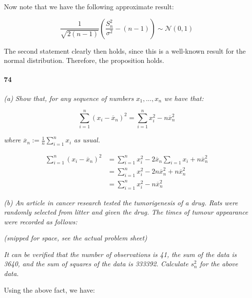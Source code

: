 \documentclass[a4paper]{article}
\begin{document}
                Now note that we have the following approximate result:

                \[
                    \frac{1}{\sqrt{2 (n-1)}}\left(\frac{S_n^2}{\sigma^2} - (n -
                    1)\right) \sim \mathcal{N}(0, 1)
                \]

                The second statement clearly then holds, since this is a
                well-known result for the normal distribution. Therefore, the
                proposition holds.

            \paragraph{74}
            \textit{(a) Show that, for any sequence of numbers $x_1, ..., x_n$
            we have that:}

            \[
                \sum_{i=1}^n (x_i - \overline x_n)^2 = \sum_{i=1}^n x_i^2 -
                n\overline x_n^2
            \]

            \textit{where $\overline x_n := \frac{1}{n} \sum\limits_{i=1}^n x_i$
            as usual.}

                \begin{align*}
                    \sum_{i=1}^n (x_i - \overline x_n)^2 & = \sum_{i=1}^n x_i^2
                        - 2\overline x_n \sum_{i=1} x_i + n \overline x_n^2 \\
                    & = \sum_{i=1}^n x_i^2 - 2 n\overline x_n^2 + n \overline
                        x_n^2 \\
                    & = \sum_{i=1}^n x_i^2 - n\overline x_n^2
                \end{align*}

            \textit{(b) An article in cancer research tested the tumorigenesis
            of a drug. Rats were randomly selected from litter and given the
            drug. The times of tumour appearance were recorded as follows:}

            \begin{center}
                \textit{(snipped for space, see the actual problem sheet)}
            \end{center}

            \textit{It can be verified that the number of observations is 41,
            the sum of the data is 3640, and the sum of squares of the data is
            333392. Calculate $s_n^2$ for the above data.}

                Using the above fact, we have:
\end{document}
